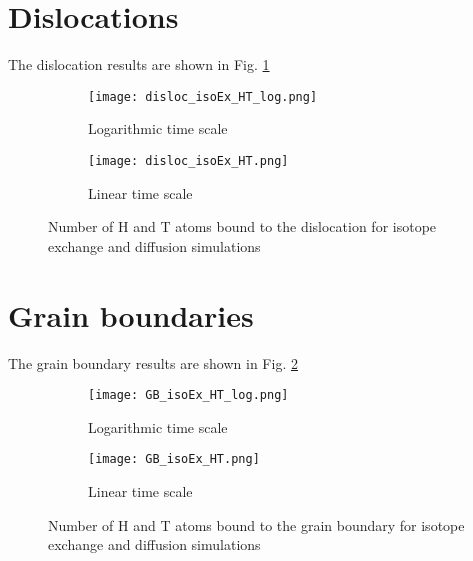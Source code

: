 \section{Dislocations}
The dislocation results are shown in Fig. \ref{Fig:disloc_results}

\begin{figure}[ht]
\begin{subfigure}{.5\textwidth}
  \centering
 \texttt{[image: disloc\_isoEx\_HT\_log.png]}  
  \caption{Logarithmic time scale}
\end{subfigure}
\begin{subfigure}{.5\textwidth}
  \centering
  \texttt{[image: disloc\_isoEx\_HT.png]}  
  \caption{Linear time scale}
\end{subfigure}
   \caption{Number of H and T atoms bound to the dislocation for isotope exchange and diffusion simulations}
   \label{Fig:disloc_results} 
\end{figure}



\section{Grain boundaries}
The grain boundary results are shown in Fig. \ref{Fig:GB_results}

\begin{figure}[ht]
\begin{subfigure}{.5\textwidth}
  \centering
 \texttt{[image: GB\_isoEx\_HT\_log.png]}  
  \caption{Logarithmic time scale}
\end{subfigure}
\begin{subfigure}{.5\textwidth}
  \centering
  \texttt{[image: GB\_isoEx\_HT.png]}  
  \caption{Linear time scale}
\end{subfigure}
   \caption{Number of H and T atoms bound to the grain boundary for isotope exchange and diffusion simulations}
   \label{Fig:GB_results} 
\end{figure}

